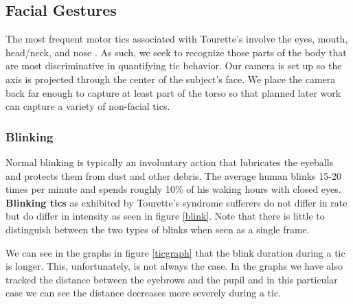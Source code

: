\documentclass[11pt]{article}
\begin{document}
\subsection{Facial Gestures}
The most frequent motor tics associated with Tourette's involve the eyes, mouth, head/neck, and nose \cite{ganos2015}. As such, we seek to recognize those parts of the body that are most discriminative in quantifying tic behavior. Our camera is set up so the axis is projected through the center of the subject's face. We place the camera back far enough to capture at least part of the torso so that planned later work can capture a variety of non-facial tics.
\subsubsection{Blinking}
Normal blinking is typically an involuntary action that lubricates the eyeballs and protects them from dust and other debris. The average human blinks 15-20 times per minute and spends roughly 10\% of his waking hours with closed eyes. \textbf{Blinking tics} as exhibited by Tourette's syndrome sufferers do not differ in rate but do differ in intensity as seen in figure \ref{blink}. Note that there is little to distinguish between the two types of blinks when seen as a single frame.

We can see in the graphs in figure \ref{ticgraph} that the blink duration during a tic is longer. This, unfortunately, is not always the case. In the graphs we have also tracked the distance between the eyebrows and the pupil and in this particular case we can see the distance decreases more severely during a tic.
\end{document}
